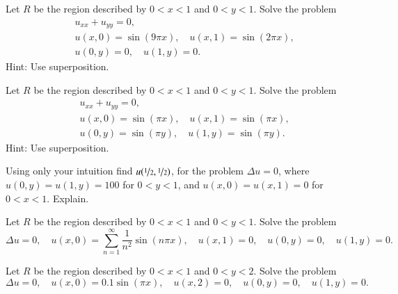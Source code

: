 \documentclass[12pt]{book}
\begin{document}
\begin{exercise}
Let $R$ be the region described by $0 < x < 1$ and $0 < y < 1$.
Solve the problem
\begin{align*}
& u_{xx} + u_{yy} = 0, \\
& u(x,0) = \sin (9 \pi x), \quad u(x,1) = \sin (2 \pi x), \\
& u(0,y) = 0, \quad u(1,y) = 0 .
\end{align*}
Hint: Use superposition.
\end{exercise}

\begin{exercise}
Let $R$ be the region described by $0 < x < 1$ and $0 < y < 1$.
Solve the problem
\begin{align*}
& u_{xx} + u_{yy} = 0, \\
& u(x,0) = \sin (\pi x), \quad u(x,1) = \sin (\pi x), \\
& u(0,y) = \sin (\pi y), \quad u(1,y) = \sin (\pi y) .
\end{align*}
Hint: Use superposition.
\end{exercise}

\begin{exercise}[challenging]
Using only your intuition find $u(\nicefrac{1}{2},\nicefrac{1}{2})$,
for the problem
$\Delta u = 0$, where $u(0,y) = u(1,y) = 100$ for $0 < y < 1$, and
$u(x,0) = u(x,1) = 0$ for $0 < x < 1$.  Explain.
\end{exercise}

\setcounter{exercise}{100}

\begin{exercise}
Let $R$ be the region described by $0 < x < 1$ and $0 < y < 1$.
Solve the problem
\begin{equation*}
\Delta u = 0, \quad u(x,0) = \sum_{n=1}^\infty \frac{1}{n^2} \sin (n \pi x),
\quad u(x,1) = 0,
\quad u(0,y) = 0, 
\quad u(1,y) = 0 .
\end{equation*}
\end{exercise}

\begin{exercise}
Let $R$ be the region described by $0 < x < 1$ and $0 < y < 2$.
Solve the problem
\begin{equation*}
\Delta u = 0, \quad u(x,0) = 0.1 \sin (\pi x),
\quad u(x,2) = 0,
\quad u(0,y) = 0, 
\quad u(1,y) = 0 .
\end{equation*}
\end{exercise}
\end{document}
